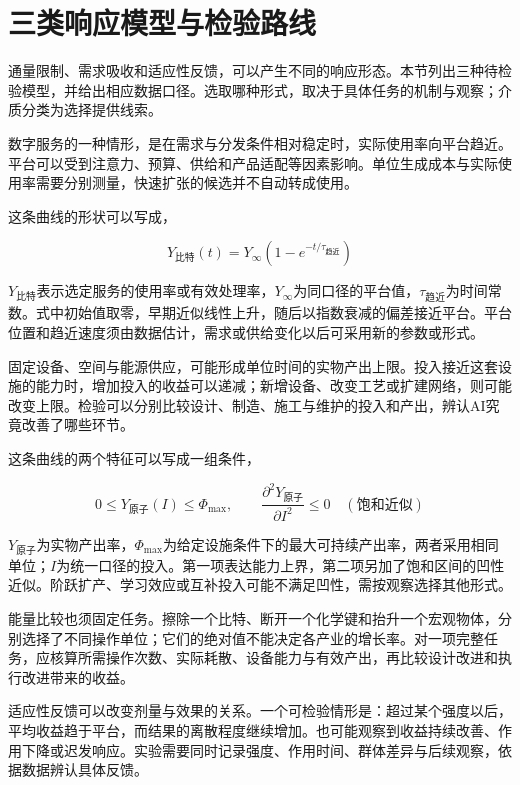 \section{三类响应模型与检验路线}

通量限制、需求吸收和适应性反馈，可以产生不同的响应形态。本节列出三种待检验模型，并给出相应数据口径。选取哪种形式，取决于具体任务的机制与观察；介质分类为选择提供线索。

数字服务的一种情形，是在需求与分发条件相对稳定时，实际使用率向平台趋近。平台可以受到注意力、预算、供给和产品适配等因素影响。单位生成成本与实际使用率需要分别测量，快速扩张的候选并不自动转成使用。

这条曲线的形状可以写成，

\begin{equation}
Y_{\text{比特}}(t)=Y_{\infty}\left(1-e^{-t/\tau_{\text{趋近}}}\right)
\end{equation}

$Y_{\text{比特}}$表示选定服务的使用率或有效处理率，$Y_\infty$为同口径的平台值，$\tau_{\text{趋近}}$为时间常数。式中初始值取零，早期近似线性上升，随后以指数衰减的偏差接近平台。平台位置和趋近速度须由数据估计，需求或供给变化以后可采用新的参数或形式。

固定设备、空间与能源供应，可能形成单位时间的实物产出上限。投入接近这套设施的能力时，增加投入的收益可以递减；新增设备、改变工艺或扩建网络，则可能改变上限。检验可以分别比较设计、制造、施工与维护的投入和产出，辨认AI究竟改善了哪些环节。

这条曲线的两个特征可以写成一组条件，

\begin{equation}
0\le Y_{\text{原子}}(I)\le \Phi_{\max},\qquad \frac{\partial^{2}Y_{\text{原子}}}{\partial I^{2}}\le0\quad(\text{饱和近似})
\end{equation}

$Y_{\text{原子}}$为实物产出率，$\Phi_{\max}$为给定设施条件下的最大可持续产出率，两者采用相同单位；$I$为统一口径的投入。第一项表达能力上界，第二项另加了饱和区间的凹性近似。阶跃扩产、学习效应或互补投入可能不满足凹性，需按观察选择其他形式。

能量比较也须固定任务。擦除一个比特、断开一个化学键和抬升一个宏观物体，分别选择了不同操作单位；它们的绝对值不能决定各产业的增长率。对一项完整任务，应核算所需操作次数、实际耗散、设备能力与有效产出，再比较设计改进和执行改进带来的收益。

适应性反馈可以改变剂量与效果的关系。一个可检验情形是：超过某个强度以后，平均收益趋于平台，而结果的离散程度继续增加。也可能观察到收益持续改善、作用下降或迟发响应。实验需要同时记录强度、作用时间、群体差异与后续观察，依据数据辨认具体反馈。

